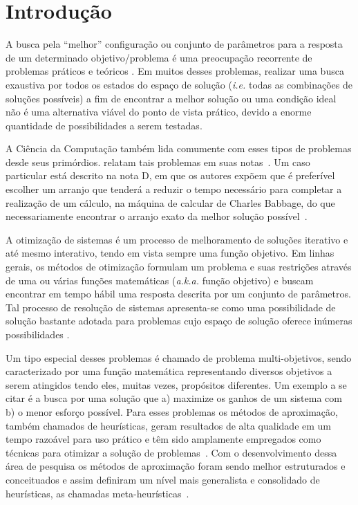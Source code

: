 \chapter[Introdução]{Introdução}

A busca pela ``melhor'' configuração ou conjunto de parâmetros para a resposta de um determinado objetivo/problema é uma preocupação recorrente de problemas práticos e teóricos \cite{combinatorialoptimization1998}. Em muitos desses problemas, realizar uma busca exaustiva por todos os estados do espaço de solução (\textit{i.e.} todas as combinações de soluções possíveis) a fim de encontrar a melhor solução ou uma condição ideal não é uma alternativa viável do ponto de vista prático, devido a enorme quantidade de possibilidades a serem testadas. 

A Ciência da Computação também lida comumente com esses tipos de problemas desde seus primórdios.  relatam tais problemas em suas notas~\cite{menabrea1842sketch}. Um caso particular está descrito na nota D, em que os autores expõem que é preferível escolher um arranjo que tenderá a reduzir o tempo necessário para completar a realização de um cálculo, na máquina de calcular de Charles Babbage, do que necessariamente encontrar o arranjo exato da melhor solução possível~\cite{menabrea1842sketch}.

A otimização de sistemas é um processo de melhoramento de soluções iterativo e até mesmo interativo, tendo em vista sempre uma função objetivo. Em linhas gerais, os métodos de otimização formulam um problema e suas restrições através de uma ou várias funções matemáticas (\textit{a.k.a.} função objetivo) e buscam encontrar em tempo hábil uma resposta descrita por um conjunto de parâmetros.  Tal processo de resolução de sistemas apresenta-se como uma possibilidade de solução bastante adotada para problemas cujo espaço de solução oferece inúmeras possibilidades \cite{snyman2005practical}. 

Um tipo especial desses problemas é chamado de problema multi-objetivos, sendo caracterizado por uma função matemática representando diversos objetivos a serem atingidos tendo eles, muitas vezes, propósitos diferentes. Um exemplo a se citar é a busca por uma solução que a) maximize os ganhos de um sistema com b) o menor esforço possível.  Para esses problemas os métodos de aproximação, também chamados de heurísticas, geram resultados de alta qualidade em um tempo razoável para uso prático e têm sido amplamente empregados como técnicas para otimizar a solução de problemas~\cite{gendreau2005metaheuristics}. Com o desenvolvimento dessa área de pesquisa os métodos de aproximação foram sendo melhor estruturados e conceituados e assim definiram um nível mais generalista e consolidado de heurísticas, as chamadas meta-heurísticas~\cite{talbi2009metaheuristics}.

